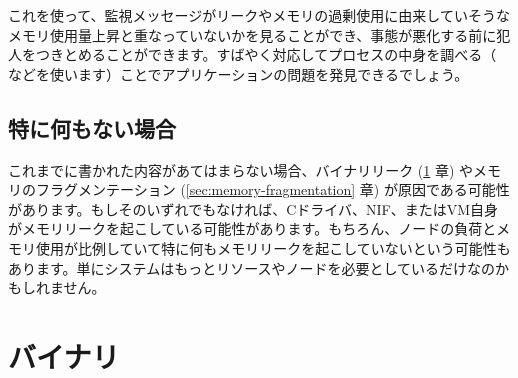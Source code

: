 これを使って、監視メッセージがリークやメモリの過剰使用に由来していそうなメモリ使用量上昇と重なっていないかを見ることができ、事態が悪化する前に犯人をつきとめることができます。すばやく対応してプロセスの中身を調べる（ などを使います）ことでアプリケーションの問題を発見できるでしょう。

\subsection{特に何もない場合}

これまでに書かれた内容があてはまらない場合、バイナリリーク (\ref{sec:binaries} 章) やメモリのフラグメンテーション (\ref{sec:memory-fragmentation} 章) が原因である可能性があります。もしそのいずれでもなければ、Cドライバ、NIF、またはVM自身がメモリリークを起こしている可能性があります。もちろん、ノードの負荷とメモリ使用が比例していて特に何もメモリリークを起こしていないという可能性もあります。単にシステムはもっとリソースやノードを必要としているだけなのかもしれません。

\section{バイナリ}
\label{sec:binaries}

